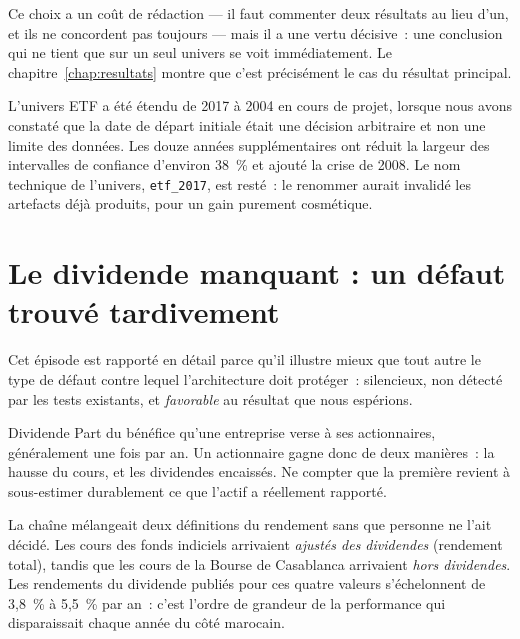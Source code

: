 Ce choix a un coût de rédaction — il faut commenter deux résultats au lieu d'un,
et ils ne concordent pas toujours — mais il a une vertu décisive~: une conclusion
qui ne tient que sur un seul univers se voit immédiatement. Le
chapitre~\ref{chap:resultats} montre que c'est précisément le cas du résultat
principal.

\begin{remarquebox}
L'univers ETF a été étendu de 2017 à 2004 en cours de projet, lorsque nous avons
constaté que la date de départ initiale était une décision arbitraire et non une
limite des données. Les douze années supplémentaires ont réduit la largeur des
intervalles de confiance d'environ 38~\% et ajouté la crise de 2008. Le nom
technique de l'univers, \texttt{etf\_2017}, est resté~: le renommer aurait
invalidé les artefacts déjà produits, pour un gain purement cosmétique.
\end{remarquebox}

\section{Le dividende manquant : un défaut trouvé tardivement}

Cet épisode est rapporté en détail parce qu'il illustre mieux que tout autre le
type de défaut contre lequel l'architecture doit protéger~: silencieux, non
détecté par les tests existants, et \emph{favorable} au résultat que nous
espérions.

\begin{definitionbox}{Dividende}
Part du bénéfice qu'une entreprise verse à ses actionnaires, généralement une
fois par an. Un actionnaire gagne donc de deux manières~: la hausse du cours, et
les dividendes encaissés. Ne compter que la première revient à sous-estimer
durablement ce que l'actif a réellement rapporté.
\end{definitionbox}

La chaîne mélangeait deux définitions du rendement sans que personne ne l'ait
décidé. Les cours des fonds indiciels arrivaient \emph{ajustés des dividendes}
(rendement total), tandis que les cours de la Bourse de Casablanca arrivaient
\emph{hors dividendes}. Les rendements du dividende publiés pour ces quatre
valeurs s'échelonnent de 3,8~\% à 5,5~\% par an~: c'est l'ordre de grandeur de la
performance qui disparaissait chaque année du côté marocain.

